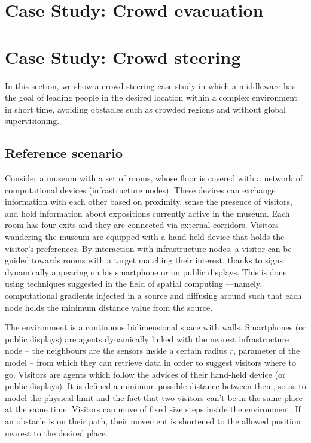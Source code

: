 \documentclass[12pt,a4paper,twoside,openright]{book}
\begin{document}
\section{Case Study: Crowd evacuation}
\section{Case Study: Crowd steering}
\label{jos-museum}
In this section, we show a crowd steering case study in which a middleware has the goal of leading people in the desired location within a complex environment in short time, avoiding obstacles such as crowded regions and without global supervisioning. 

\subsection{Reference scenario}

Consider a museum with a  set of rooms, whose floor is covered with a network of computational devices (infrastructure nodes).
%
These devices can exchange information with each other based on proximity, sense the presence of visitors, and hold information about expositions currently active in the museum.
%
Each room has four exits and they are connected via external corridors. Visitors wandering the museum are equipped with a hand-held device that holds the visitor's preferences.
%
By interaction with infrastructure nodes, a visitor can be guided towards rooms with a target matching their interest, thanks to signs dynamically appearing on his smartphone or on public displays.
%
This is done using techniques suggested in the field of spatial computing \cite{VCMZ-TAAS2011}---namely, computational gradients injected in a source and diffusing around such that each node holds the minimum distance value from the source.

The environment is a continuous bidimensional space with walls. 
%
Smartphones (or public displays) are agents dynamically linked with the nearest infrastructure node -- the neighbours are the sensors inside a certain radius $r$, parameter of the model -- from which they can retrieve data in order to suggest visitors where to go. Visitors are agents which follow the advices of their hand-held device (or public displays). It is defined a minimum possible distance between them, so as to model the physical limit and the fact that two visitors can't be in the same place at the same time. Visitors can move of fixed size steps inside the environment. If an obstacle is on their path, their movement is shortened to the allowed position nearest to the desired place.
\end{document}

